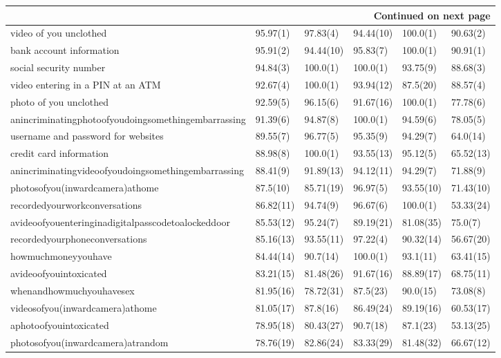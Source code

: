 \documentclass[a4paper,12pt]{article}
\begin{document}
\begin{longtable}{| p{7cm} | l | l | l | l | l |}
\hline \multicolumn{6}{|r|}{{Continued on next page}} \\ \hline
\endfoot
\hline 
\endlastfoot
video of you unclothed & 95.97(1) & 97.83(4) & 94.44(10) & 100.0(1) & 90.63(2) \\ 
bank account information & 95.91(2) & 94.44(10) & 95.83(7) & 100.0(1) & 90.91(1) \\ 
social security number & 94.84(3) & 100.0(1) & 100.0(1) & 93.75(9) & 88.68(3) \\ 
video entering in a PIN at an ATM & 92.67(4) & 100.0(1) & 93.94(12) & 87.5(20) & 88.57(4) \\ 
photo of you unclothed & 92.59(5) & 96.15(6) & 91.67(16) & 100.0(1) & 77.78(6) \\ 
anincriminatingphotoofyoudoingsomethingembarrassing & 91.39(6) & 94.87(8) & 100.0(1) & 94.59(6) & 78.05(5) \\ 
username and password for websites & 89.55(7) & 96.77(5) & 95.35(9) & 94.29(7) & 64.0(14) \\ 
credit card information & 88.98(8) & 100.0(1) & 93.55(13) & 95.12(5) & 65.52(13) \\ 
anincriminatingvideoofyoudoingsomethingembarrassing & 88.41(9) & 91.89(13) & 94.12(11) & 94.29(7) & 71.88(9) \\ 
photosofyou(inwardcamera)athome & 87.5(10) & 85.71(19) & 96.97(5) & 93.55(10) & 71.43(10) \\ 
recordedyourworkconversations & 86.82(11) & 94.74(9) & 96.67(6) & 100.0(1) & 53.33(24) \\ 
avideoofyouenteringinadigitalpasscodetoalockeddoor & 85.53(12) & 95.24(7) & 89.19(21) & 81.08(35) & 75.0(7) \\ 
recordedyourphoneconversations & 85.16(13) & 93.55(11) & 97.22(4) & 90.32(14) & 56.67(20) \\ 
howmuchmoneyyouhave & 84.44(14) & 90.7(14) & 100.0(1) & 93.1(11) & 63.41(15) \\ 
avideoofyouintoxicated & 83.21(15) & 81.48(26) & 91.67(16) & 88.89(17) & 68.75(11) \\ 
whenandhowmuchyouhavesex & 81.95(16) & 78.72(31) & 87.5(23) & 90.0(15) & 73.08(8) \\ 
videosofyou(inwardcamera)athome & 81.05(17) & 87.8(16) & 86.49(24) & 89.19(16) & 60.53(17) \\ 
aphotoofyouintoxicated & 78.95(18) & 80.43(27) & 90.7(18) & 87.1(23) & 53.13(25) \\ 
photosofyou(inwardcamera)atrandom & 78.76(19) & 82.86(24) & 83.33(29) & 81.48(32) & 66.67(12) \\ 

\end{longtable}
\end{document}
